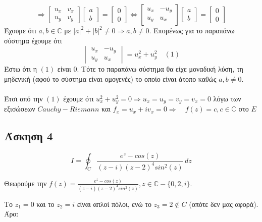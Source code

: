 \documentclass[12pt]{article}
\begin{document}
\[
\Rightarrow
\begin{bmatrix}
    u_x & v_x \\
    u_y & v_y 
\end{bmatrix}
\begin{bmatrix}
	a \\
	b
\end{bmatrix}
=
\begin{bmatrix}
0\\
0
\end{bmatrix}
\Leftrightarrow
\begin{bmatrix}
    u_x & -u_y \\
    u_y & u_x 
\end{bmatrix}
\begin{bmatrix}
	a \\
	b
\end{bmatrix}
=
\begin{bmatrix}
0\\
0
\end{bmatrix}
\]
Έχουμε ότι $ a,b \in \mathbb{C} $ με $ |a|^2+|b|^2\neq0 \Rightarrow a ,b \neq 0$. Eπομένως για το παραπάνω σύστημα έχουμε ότι \[ \begin{vmatrix}
u_x & -u_y \\
    u_y & u_x
\end{vmatrix}=u_x^2+u_y^2 \quad (1)
\]
Έστω ότι η $(1)$ είναι 0. Τότε το παραπάνω σύστημα θα είχε μοναδική λύση, τη μηδενική (αφού το σύστημα είναι ομογενές) το οποίο είναι άτοπο καθώς $a ,b \neq 0$.
\\
\\
Έτσι από την $(1)$ έχουμε ότι  $u_x^2+u_y^2=0 \Rightarrow u_x=u_y=v_y=v_x=0$ λόγω των εξισώσεων $Cauchy-Riemann$  και $f_x=u_x+iv_x=0\Rightarrow \quad f(z)=c,c\in\mathbb{C}$ στο $E$
\newpage
 \subsection{Άσκηση 4}
$$Ι=\oint_{C} \frac{e^z-cos(z)}{(z-i)(z-2)^{4}sin^2(z)}  \,dz$$

Θεωρούμε την  $f(z)=\frac{e^z-cos(z)}{(z-i)(z-2)^{4}sin^2(z)},z\in\mathbb{C}-\{0,2,i\}$.


\newline
Το $z_1=0$ και το $z_2=i$ είναι απλοί πόλοι, ενώ το $z_3=2 \notin C$ (οπότε δεν μας αφορά). Άρα:
\end{document}
